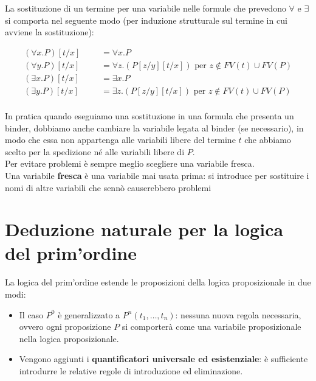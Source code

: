 \documentclass[
  a4paper,
]{article}
\providecommand{\tightlist}{%
  \setlength{\itemsep}{0pt}\setlength{\parskip}{0pt}}
\begin{document}
La sostituzione di un termine per una variabile nelle formule che
prevedono \(\forall\) e \(\exists\) si comporta nel seguente modo (per
induzione strutturale sul termine in cui avviene la sostituzione):

\[
\begin{aligned}
(\forall x.P)[t/x] &&& = \forall x.P \\[6pt]
(\forall y.P)[t/x] &&& = \forall z.(P[z/y][t/x]) \text{ per } z \notin FV(t) \cup FV(P) \\[6pt]
(\exists x.P)[t/x] &&& = \exists x.P \\[6pt]
(\exists y.P)[t/x] &&& = \exists z.(P[z/y][t/x]) \text{ per } z \notin FV(t) \cup FV(P) \\[6pt]
\end{aligned}
\]

In pratica quando eseguiamo una sostituzione in una formula che presenta
un binder, dobbiamo anche cambiare la variabile legata al binder (se
necessario), in modo che essa non appartenga alle variabili libere del
termine \(t\) che abbiamo scelto per la spedizione né alle variabili
libere di \(P\).\\
Per evitare problemi è sempre meglio scegliere una variabile fresca.\\
Una variabile \textbf{fresca} è una variabile mai usata prima: si
introduce per sostituire i nomi di altre variabili che sennò
causerebbero problemi

\newpage

\hypertarget{deduzione-naturale-per-la-logica-del-primordine}{%
\section{Deduzione naturale per la logica del
prim'ordine}\label{deduzione-naturale-per-la-logica-del-primordine}}

La logica del prim'ordine estende le proposizioni della logica
proposizionale in due modi:

\begin{itemize}
\tightlist
\item
  Il caso \(P^0\) è generalizzato a \(P^n(t_1, \dots , t_n)\): nessuna
  nuova regola necessaria, ovvero ogni proposizione \(P\) si comporterà
  come una variabile proposizionale nella logica proposizionale.
\item
  Vengono aggiunti i \textbf{quantificatori universale ed esistenziale}:
  è sufficiente introdurre le relative regole di introduzione ed
  eliminazione.
\end{itemize}
\end{document}
